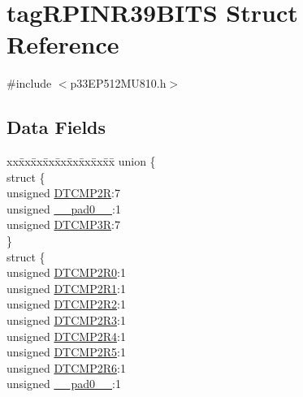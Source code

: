 \hypertarget{structtag_r_p_i_n_r39_b_i_t_s}{}\section{tag\+R\+P\+I\+N\+R39\+B\+I\+TS Struct Reference}
\label{structtag_r_p_i_n_r39_b_i_t_s}


{\ttfamily \#include $<$p33\+E\+P512\+M\+U810.\+h$>$}

\subsection*{Data Fields}
\begin{DoxyCompactItemize}
\item 
\begin{tabbing}
xx\=xx\=xx\=xx\=xx\=xx\=xx\=xx\=xx\=\kill
union \{\\
\>struct \{\\
\>\>unsigned \hyperlink{structtag_r_p_i_n_r39_b_i_t_s_a4c011ade32efc54771191f22ec2bfbb9}{DTCMP2R}:7\\
\>\>unsigned \hyperlink{structtag_r_p_i_n_r39_b_i_t_s_adf71f3d8410c1f1dbbc96680a92c49af}{\_\_pad0\_\_}:1\\
\>\>unsigned \hyperlink{structtag_r_p_i_n_r39_b_i_t_s_aee1b74fa3c6a98772e5165ecb4ce4d20}{DTCMP3R}:7\\
\>\} \\
\>struct \{\\
\>\>unsigned \hyperlink{structtag_r_p_i_n_r39_b_i_t_s_a73be1e438e0f93cebb590c71abbb48ba}{DTCMP2R0}:1\\
\>\>unsigned \hyperlink{structtag_r_p_i_n_r39_b_i_t_s_a389b95228bd7000233ae483090278d0c}{DTCMP2R1}:1\\
\>\>unsigned \hyperlink{structtag_r_p_i_n_r39_b_i_t_s_a4dac7ab8f3b7afe0e1eb8cb4b5e21e7f}{DTCMP2R2}:1\\
\>\>unsigned \hyperlink{structtag_r_p_i_n_r39_b_i_t_s_ac3aaaae9006dbeccf45e4e9a074e42b8}{DTCMP2R3}:1\\
\>\>unsigned \hyperlink{structtag_r_p_i_n_r39_b_i_t_s_a4312e3d342a6ab8e46d960f63f740df4}{DTCMP2R4}:1\\
\>\>unsigned \hyperlink{structtag_r_p_i_n_r39_b_i_t_s_ae1f0f93b87737148844027651c7964e6}{DTCMP2R5}:1\\
\>\>unsigned \hyperlink{structtag_r_p_i_n_r39_b_i_t_s_a334beb2390725060440b443b2e7a1c01}{DTCMP2R6}:1\\
\>\>unsigned \hyperlink{structtag_r_p_i_n_r39_b_i_t_s_adf71f3d8410c1f1dbbc96680a92c49af}{\_\_pad0\_\_}:1\\

\end{tabbing}
\end{DoxyCompactItemize}
